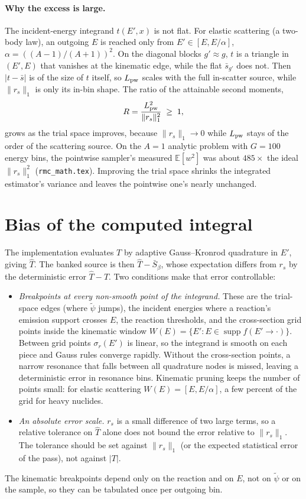 \documentclass[11pt]{article}
\newcommand{\tpsi}{\tilde\psi}
\newcommand{\Sbar}{\bar S}
\newcommand{\E}{\mathbb{E}}
\begin{document}
\paragraph{Why the excess is large.} The incident-energy integrand $t(E',x)$ is not flat.
For elastic scattering (a two-body law), an outgoing $E$ is reached only from
$E'\in[E, E/\alpha]$, $\alpha = ((A-1)/(A+1))^2$. On the diagonal blocks $g'\approx g$,
$t$ is a triangle in $(E',E)$ that vanishes at the kinematic edge, while the flat
$\bar s_{g'}$ does not. Then $|t-\bar s|$ is of the size of $t$ itself, so
$L_{\rm pw}$ scales with the full in-scatter source, while $\|r_s\|_1$ is only its
in-bin shape. The ratio of the attainable second moments,
\begin{equation}
  R = \frac{L_{\rm pw}^2}{\|r_s\|_1^2} \;\ge\; 1,
\end{equation}
grows as the trial space improves, because $\|r_s\|_1\to 0$ while $L_{\rm pw}$ stays
of the order of the scattering source. On the $A=1$ analytic problem with $G=100$
energy bins, the pointwise sampler's measured $\E[w^2]$ was about $485\times$ the ideal
$\|r_s\|_1^2$ (\texttt{rmc\_math.tex}). Improving the trial space shrinks the
integrated estimator's variance and leaves the pointwise one's nearly unchanged.

\section{Bias of the computed integral}

The implementation evaluates $T$ by adaptive Gauss--Kronrod quadrature in $E'$, giving
$\widehat T$. The banked source is then $\widehat T - \Sbar_\beta$, whose expectation
differs from $r_s$ by the deterministic error $\widehat T - T$. Two conditions make that
error controllable:
\begin{itemize}
  \item \emph{Breakpoints at every non-smooth point of the integrand.} These are the
  trial-space edges (where $\tpsi$ jumps), the incident energies where a reaction's
  emission support crosses $E$, the reaction thresholds, and the cross-section grid
  points inside the kinematic window $W(E)=\{E' : E\in\operatorname{supp}
  f(E'\to\cdot)\}$. Between grid points $\sigma_r(E')$ is linear, so the integrand is
  smooth on each piece and Gauss rules converge rapidly. Without the cross-section
  points, a narrow resonance that falls between all quadrature nodes is missed,
  leaving a deterministic error in resonance bins. Kinematic pruning keeps the number
  of points small: for elastic scattering $W(E)=[E, E/\alpha]$, a few percent of the
  grid for heavy nuclides.
  \item \emph{An absolute error scale.} $r_s$ is a small difference of two large terms,
  so a relative tolerance on $\widehat T$ alone does not bound the error relative to
  $\|r_s\|_1$. The tolerance should be set against $\|r_s\|_1$ (or the expected
  statistical error of the pass), not against $|T|$.
\end{itemize}
The kinematic breakpoints depend only on the reaction and on $E$, not on $\tpsi$ or on
the sample, so they can be tabulated once per outgoing bin.
\end{document}
